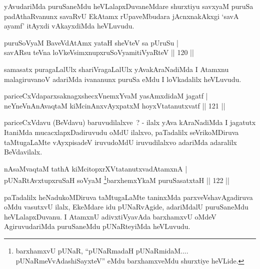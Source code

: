 \begin{artha}
yAvudariMda puruSaneMdu heVLalapxDuvaneMdare shurxtiyu savxyaM puruSa padAthaRvanunx savaRvU EkAtamx rUpaveMbudara jAcnxnakAkxgi `savA ayamf' itAyxdi vAkayxdiMda heVLuvudu.
\end{artha}

\begin{shl}
puruSoV\s yaM BaveVdAtAmx yataH sheVteV sa pUruSu |\\
savARsu teVna loVkeV\s simxnupxruSoV\s yamitiVyaRteV \hfill || 120 ||
\end{shl}

\begin{artha}
samasatx puragaLalUlx shariVragaLalUlx yAvakAraNadiMda I Atamxnu malagiruvanoV adariMda ivananunx puruSa eMdu I loVkadalilx heVLuvudu.
\end{artha}


\begin{shl}
pariceCxVdaparxsaknagxshecxVnemxYvaM yasAmxdidaM jagatf |\\
neYneVnAnAvaqtaM kiMcinAnxvAyxpatxM hoyxVtatanutxvatf \hfill || 121 ||
\end{shl}	

\begin{artha}
pariceCxVdavu (BeVdavu) baruvudilalxve~? - ilalx yAva kAraNadiMda I
jagatutx ItaniMda mucacxlapxDadiruvudu oMdU ilalxvo, paTadalilx
seVrikoMDiruva taMtugaLaMte vAyxpisadeV iruvudoMdU iruvudilalxvo
adariMda adaralilx BeVdavilalx.
\end{artha}

\begin{shl}
nAsaMvaqtaM tathA kiMcitopxrXVtatanutxvadAtamxnA |\\
pUNaRtAvxtupxruSaH soV\s yaM \footnote{barxhamxvU pUNaR, ``pUNaRmadaH pUNaRmidaM.... pUNaRmeVvAdashiSayxteV'' eMdu barxhamxveMdu shurxtiye heVLide.}barxhemxYkaM puruSasatxtaH \hfill || 122 ||
\end{shl}

\begin{artha}
paTadalilx heNadukoMDiruva taMtugaLaMte taninxMda parxveVshavAgadiruva oMdu vasutxvU ilalx, EkeMdare idu pUNaRvAgide, adariMdalU puruSaneMdu heVLalapxDuvanu. I AtamxnU adivxtiVyavAda barxhamxvU oMdeV AgiruvudariMda puruSaneMdu pUNaRteyiMda heVLuvudu.
\end{artha}


